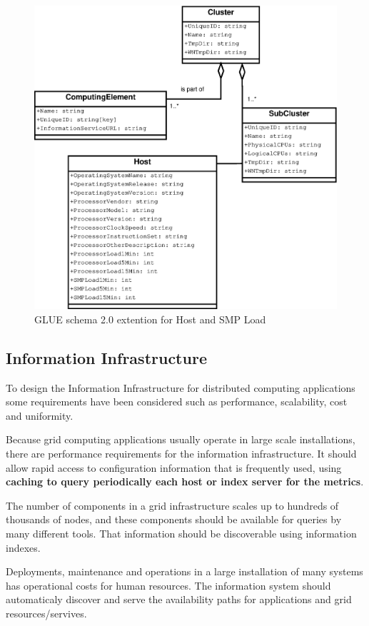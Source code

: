 \begin{figure}[htb]
\centering
 \includegraphics[width=5in]{images/gluece_ext.eps}
\caption{GLUE schema 2.0 extention for Host and SMP Load}
\label{figure:gluece_ext}
\end{figure}


\subsection{Information Infrastructure}
To design the Information Infrastructure for distributed computing applications some requirements have been considered such as performance, scalability, cost and uniformity.

Because grid computing applications usually operate in large scale installations, there are performance requirements for the information infrastructure. It should allow rapid access to configuration information that is frequently used, using {\bf caching to query periodically each host or index server for the metrics}.

The number of components in a grid infrastructure scales up to hundreds of thousands of nodes, and these components should be available for queries by many different tools. That information should be discoverable using information indexes.

Deployments, maintenance and operations in a large installation of many systems has operational costs for human resources. The information system should automaticaly discover and serve the availability paths for applications and grid resources/servives.

